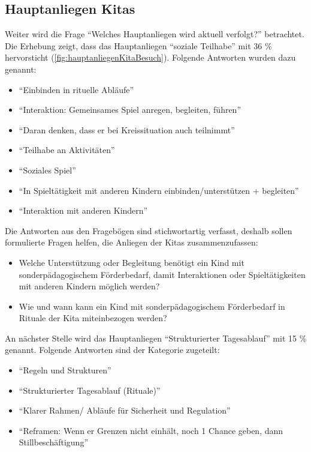 \documentclass[
  ngerman,
  11pt,
  paper=a4,
  twoside,
  titlepage=true,
  openright,
  abstract=on,
  toc=listofnumbered,
  numbers=noenddot,
  chapterprefix=true,
  headings=optiontohead,
  svgnames,
  dvipsnames]{scrreprt}
\providecommand{\tightlist}{%
  \setlength{\itemsep}{0pt}\setlength{\parskip}{0pt}}
\begin{document}
\hypertarget{hauptanliegen-kitas}{%
\subsection{Hauptanliegen Kitas}\label{hauptanliegen-kitas}}

Weiter wird die Frage “Welches Hauptanliegen wird aktuell verfolgt?”
betrachtet. Die Erhebung zeigt, dass das Hauptanliegen “soziale
Teilhabe” mit 36 \% hervorsticht (\cref{fig:hauptanliegenKitaBesuch}).
Folgende Antworten wurden dazu genannt:

\begin{itemize}
\tightlist
\item
  “Einbinden in rituelle Abläufe”
\item
  “Interaktion: Gemeinsames Spiel anregen, begleiten, führen”
\item
  “Daran denken, dass er bei Kreissituation auch teilnimmt”
\item
  “Teilhabe an Aktivitäten”
\item
  “Soziales Spiel”
\item
  “In Spieltätigkeit mit anderen Kindern einbinden/unterstützen +
  begleiten”
\item
  “Interaktion mit anderen Kindern”
\end{itemize}

Die Antworten aus den Fragebögen sind stichwortartig verfasst, deshalb
sollen formulierte Fragen helfen, die Anliegen der Kitas
zusammenzufassen:

\begin{itemize}
\tightlist
\item
  Welche Unterstützung oder Begleitung benötigt ein Kind mit
  sonderpädagogischem Förderbedarf, damit Interaktionen oder
  Spieltätigkeiten mit anderen Kindern möglich werden?
\item
  Wie und wann kann ein Kind mit sonderpädagogischem Förderbedarf in
  Rituale der Kita miteinbezogen werden?
\end{itemize}

An nächster Stelle wird das Hauptanliegen “Strukturierter Tagesablauf”
mit 15 \% genannt. Folgende Antworten sind der Kategorie zugeteilt:

\begin{itemize}
\tightlist
\item
  “Regeln und Strukturen”
\item
  “Strukturierter Tagesablauf (Rituale)”
\item
  “Klarer Rahmen/ Abläufe für Sicherheit und Regulation”
\item
  “Reframen: Wenn er Grenzen nicht einhält, noch 1 Chance geben, dann
  Stillbeschäftigung”
\end{itemize}
\end{document}
